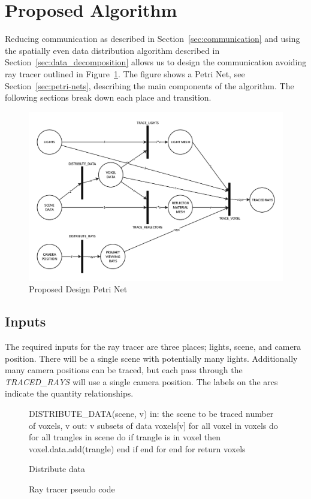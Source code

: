 \section{Proposed Algorithm}
\label{sec:proposed_algorithm}
Reducing communication as described in Section~\ref{sec:communication} and using
the spatially even data distribution algorithm described in 
Section~\ref{sec:data_decomposition} allows us to design the communication 
avoiding ray tracer outlined in Figure~\ref{fig:design}.  The figure shows a 
Petri Net, see Section~\ref{sec:petri-nets}, describing the main components of 
the algorithm.  The following sections break down each place and transition.

\begin{figure}[!htb]
\centering
  \includegraphics[width=\linewidth]{drawings/Design.pdf}
\caption{Proposed Design Petri Net}
\label{fig:design}
\end{figure}

\subsection{Inputs}
The required inputs for the ray tracer are three places; lights, scene, and 
camera position.  There will be a single scene with potentially many lights.  
Additionally many camera positions can be traced, but each pass through the 
\emph{TRACED\_RAYS} will use a single camera position.  The labels on the arcs 
indicate the quantity relationships.

\begin{figure}[!htb]
\begin{algorithm}
DISTRIBUTE_DATA(scene, v)
  in:  the scene to be traced
       number of voxels, v
  out: v subsets of data
  voxels[v]
  for all voxel in voxels do
    for all trangles in scene do
      if trangle is in voxel then
        voxel.data.add(trangle)
      end if
    end for
  end for
return voxels
\end{algorithm}
Distribute data
\endminipage\hfill
\caption{Ray tracer pseudo code}
\label{fig:ray_tracing_1}
\end{figure}

